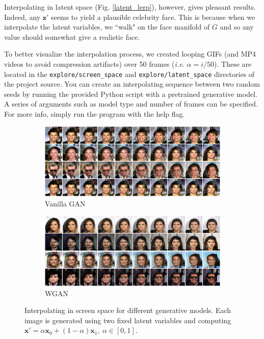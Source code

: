 \documentclass[table]{article}
\def\*#1{\mathbf{#1}}
\newcommand{\code}[1]{{\color{Blue}\small\texttt{#1}}}
\begin{document}
Interpolating in latent space (Fig. \ref{latent_lerp}), however, gives pleasant results. Indeed, any $\*z'$ seems to yield a plausible celebrity face. This is because when we interpolate the latent variables, we ``walk" on the face manifold of $G$ and so any value should somewhat give a realistic face.

To better visualize the interpolation process, we created looping GIFs (and MP4 videos to avoid compression artifacts) over 50 frames (\textit{i.e.} $\alpha = i/50$). These are located in the \code{explore/screen\_space} and \code{explore/latent\_space} directories of the project source. You can create an interpolating sequence between two random seeds by running the provided Python script with a pretrained generative model. A series of arguments such as model type and number of frames can be specified. For more info, simply run the program with the help flag.

\clearpage
\begin{figure}
  \centering
  \begin{subfigure}{\textwidth}
    \centering
    \includegraphics[scale=0.5]{imgs/gan_screen_lerp}
    \caption{Vanilla GAN}
  \end{subfigure}

  \vspace*{3mm}
  \begin{subfigure}{\textwidth}
    \centering
    \includegraphics[scale=0.5]{imgs/wgan_screen_lerp}
    \caption{WGAN}
  \end{subfigure}
  \caption{Interpolating in screen space for different generative models. Each image is generated using two fixed latent variables and computing $\*x' = \alpha \*x_0 + (1-\alpha)\*x_1, \ \alpha \in [0,1]$.}
  \label{screen_lerp}
\end{figure}
\end{document}
